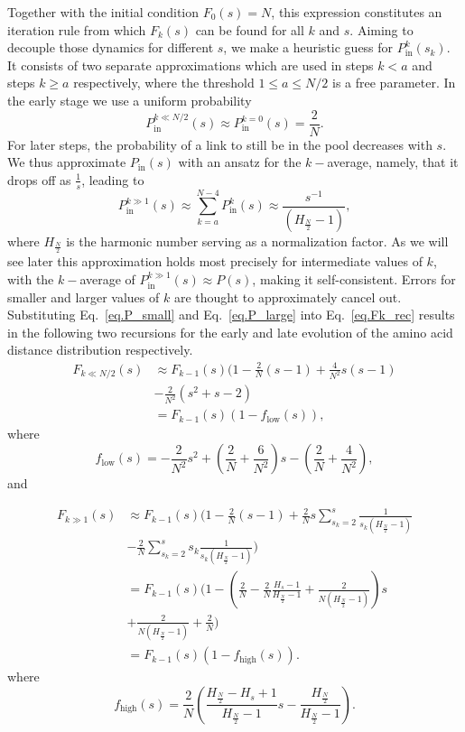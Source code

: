 \documentclass[
reprint,
twocolumn,
amsmath,amssymb,superscriptaddress,aps,
pre]{revtex4-1}
\newcommand{\Pin}{P_{\mathrm{in}}}
\newcommand{\fhigh}{f_{\mathrm{high}}}
\newcommand{\flow}{f_{\mathrm{low}}}
\begin{document}
Together with the initial condition $F_0(s)=N$, this expression constitutes an iteration rule from which $F_k(s)$ can be found for all $k$ and $s$. Aiming to decouple those dynamics for different $s$, we make a heuristic guess for $\Pin^k(s_k)$. It consists of two separate approximations which are used in steps $k<a$ and steps $k\geq a$ respectively, where the threshold $1\leq a\leq N/2$ is a free parameter. In the early stage we use a uniform probability
\begin{equation}
    \Pin^{k\ll N/2}(s)\approx \Pin^{k=0}(s)=\frac{2}{N}.
    \label{eq.P_small}
\end{equation}
For later steps, the probability of a link to still be in the pool decreases with $s$. We thus approximate $\Pin(s)$ with an ansatz for the $k-$average, namely, that it drops off as $\frac{1}{s}$, leading to
\begin{equation}
    \Pin^{k\gg 1}(s)\approx \sum_{k=a}^{N-4}\Pin^{k}(s)
    \approx \frac{s^{-1}}{ (H_{\frac{N}{2}}-1)},
    \label{eq.P_large}
\end{equation}
where $H_{\frac{N}{2}}$ is the harmonic number serving as a normalization factor. 
As we will see later this approximation holds most precisely for intermediate values of $k$, with the $k-$average of $\Pin^{k\gg 1}(s)\approx P(s)$, making it self-consistent. Errors for smaller and larger values of $k$ are thought to approximately cancel out.
Substituting Eq.~\ref{eq.P_small} and Eq.~\ref{eq.P_large} into Eq.~\ref{eq.Fk_rec} results in the following two recursions for the early and late evolution of the amino acid distance distribution respectively.
\begin{align}
   F_{k\ll N/2}(s)&\approx 
   F_{k-1}(s)(1-\frac{2}{N} (s-1) 
   +\frac{4}{N^2} s (s-1)\nonumber \\
   &-\frac{2}{N^2}(s^2+s-2)\nonumber \\
   &=F_{k-1}(s)(1-\flow(s)),
   \label{eq.Fk_rec_low}
\end{align}
where 
\[\flow(s)=-\frac{2}{N^2}s^2+\left(\frac{2}{N}+\frac{6}{N^2}\right)s-\left(\frac{2}{N}+\frac{4}{N^2}\right),\]
and


\begin{align}
   F_{k\gg1}(s)&\approx 
   F_{k-1}(s)(1-\frac{2}{N} (s-1) 
   +\frac{2}{N} s \sum_{s_k=2}^{s}\frac{1}{s_k(H_{\frac{N}{2}}-1)}\nonumber\\
   &-\frac{2}{N}
   \sum_{s_k=2}^{s} s_k \frac{1}{s_k(H_{\frac{N}{2}}-1)})\nonumber \\
   &=
   F_{k-1}(s)(1 -(\frac{2}{N}-\frac{2}{N}\frac{H_{s}-1}{H_{\frac{N}{2}}-1}+\frac{2}{N(H_{\frac{N}{2}}-1)})s \nonumber \\ 
   &+ \frac{2}{N(H_{\frac{N}{2}}-1)} + \frac{2}{N})\nonumber \\
   &=F_{k-1}(s)(1-\fhigh(s)).
   \label{eq.Fk_rec_high}
\end{align}
where 
\[\fhigh(s)=\frac{2}{N}(\frac{H_{\frac{N}{2}}-H_{s}+1}{H_{\frac{N}{2}}-1}s-\frac{H_{\frac{N}{2}}}{H_{\frac{N}{2}}-1}).\]
\end{document}
